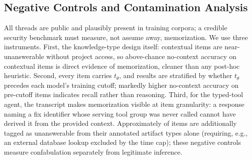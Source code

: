 \subsection{Negative Controls and Contamination Analysis}
\label{sec:contamination}

All threads are public and plausibly present in training corpora; a credible
security benchmark must measure, not assume away, memorization. We use three
instruments. First, the knowledge-type design itself: contextual items are
near-unanswerable without project access, so above-chance no-context accuracy
on contextual items is direct evidence of memorization, cleaner than any
post-hoc heuristic. Second, every item carries $t_\theta$, and results are
stratified by whether $t_\theta$ precedes each model's training cutoff;
markedly higher no-context accuracy on pre-cutoff items indicates recall rather
than reasoning. Third, for the typed-tool agent, the transcript makes
memorization visible at item granularity: a response naming a fix identifier
whose serving tool group was never called cannot have derived it from the
provided context. Approximately  of items are additionally tagged as
unanswerable from their annotated artifact types alone (requiring, e.g., an
external database lookup excluded by the time cap); these negative controls
measure confabulation separately from legitimate inference.
